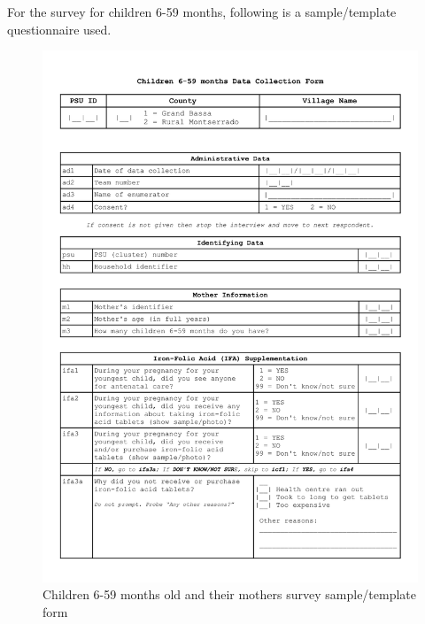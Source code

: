 \documentclass[12pt,a4paper]{article}
\theoremstyle{definition}
\theoremstyle{definition}
\theoremstyle{definition}
\theoremstyle{remark}
\begin{document}
For the survey for children 6-59 months, following is a sample/template
questionnaire used.

\begin{figure}[H]

{\centering \includegraphics[width=0.9\linewidth]{forms/childForm1} 

}

\caption{Children 6-59 months old and their mothers survey sample/template form}\label{fig:childform1}
\end{figure}\begin{figure}[H]


\end{figure}
\end{document}
